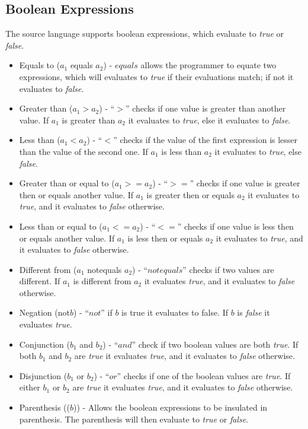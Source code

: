 \subsection{Boolean Expressions}
The source language supports boolean expressions, which evaluate to \textit{true} or \textit{false}.
\begin{itemize}
	\item Equals to ($a_1$ equals $a_2$) - $equals$ allows the programmer to equate two expressions, which will evaluates to \textit{true} if their evaluations match; if not it evaluates to \textit{false}.
	\item Greater than ($a_1 > a_2$) - ``$>$'' checks if one value is greater than another value. If $a_1$ is greater than $a_2$ it evaluates to \textit{true}, else it evaluates to \textit{false}.
	\item Less than ($a_1 < a_2$) - ``$<$'' checks if the value of the first expression is lesser than the value of the second one. If $a_1$ is less than $a_2$ it evaluates to \textit{true}, else \textit{false}.
	\item Greater than or equal to ($a_1 >= a_2$) - ``$>=$'' checks if one value is greater then or equals another value. If $a_1$ is greater then or equals $a_2$ it evaluates to \textit{true}, and it evaluates to \textit{false} otherwise.
	\item Less than or equal to ($a_1 <= a_2$) - ``$<=$'' checks if one value is less then or equals another value. If $a_1$ is less then or equals $a_2$ it evaluates to \textit{true}, and it evaluates to \textit{false} otherwise.
	\item Different from ($a_1$ notequals $a_2$) - ``$notequals$'' checks if two values are different. If $a_1$ is different from $a_2$ it evaluates \textit{true}, and it evaluates to \textit{false} otherwise. 
	\item Negation (not$b$) - ``$not$'' if $b$ is true it evaluates to false. If $b$ is \textit{false} it evaluates \textit{true}.
	\item Conjunction ($b_1$ and $b_2$) - ``$and$'' check if two boolean values are both \textit{true}. If both $b_1$ and $b_2$ are \textit{true} it evaluates \textit{true}, and it evaluates to \textit{false} otherwise. 
	\item Disjunction ($b_1$ or $b_2$) - ``$or$'' checks if one of the boolean values are \textit{true}. If either $b_1$ or $b_2$ are \textit{true} it evaluates \textit{true}, and it evaluates to \textit{false} otherwise.
	\item Parenthesis (($b$)) - Allows the boolean expressions to be insulated in parenthesis. The parenthesis will then evaluate to \textit{true} or \textit{false}.
\end{itemize}
